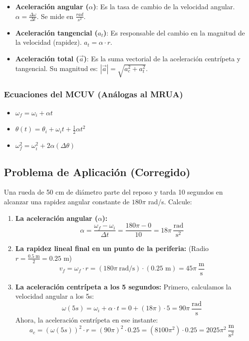 \documentclass[11pt]{article}
\begin{document}
\begin{itemize}
	\item \textbf{Aceleración angular ($\alpha$)}: Es la tasa de cambio de la velocidad angular. $\alpha = \frac{\Delta \omega}{\Delta t}$. Se mide en $\frac{rad}{s^2}$.
	\item \textbf{Aceleración tangencial ($a_t$)}: Es responsable del cambio en la magnitud de la velocidad (rapidez). $a_t = \alpha \cdot r$.
	\item \textbf{Aceleración total ($\vec{a}$)}: Es la suma vectorial de la aceleración centrípeta y tangencial. Su magnitud es: $|\vec{a}| = \sqrt{a_c^2 + a_t^2}$.
\end{itemize}

\subsubsection{Ecuaciones del MCUV (Análogas al MRUA)}
\begin{itemize}
	\item $\omega_f = \omega_i + \alpha t$
	\item $\theta(t) = \theta_i + \omega_i t + \frac{1}{2}\alpha t^2$
	\item $\omega_f^2 = \omega_i^2 + 2\alpha (\Delta\theta)$
\end{itemize}

\subsection{Problema de Aplicación (Corregido)}
Una rueda de 50 cm de diámetro parte del reposo y tarda 10 segundos en alcanzar una rapidez angular constante de $180\pi$ rad/s. Calcule:
\begin{enumerate}
	\item \textbf{La aceleración angular ($\alpha$):}
	      \[ \alpha = \frac{\omega_f - \omega_i}{\Delta t} = \frac{180\pi - 0}{10} = 18\pi \ \frac{\text{rad}}{\text{s}^2} \]

	\item \textbf{La rapidez lineal final en un punto de la periferia:} (Radio $r = \frac{0.5 \text{ m}}{2} = 0.25$ m)
	      \[ v_f = \omega_f \cdot r = (180\pi \ \text{rad/s}) \cdot (0.25 \text{ m}) = 45\pi \ \frac{\text{m}}{\text{s}} \]

	\item \textbf{La aceleración centrípeta a los 5 segundos:}
	      Primero, calculamos la velocidad angular a los 5s:
	      \[ \omega(5s) = \omega_i + \alpha \cdot t = 0 + (18\pi) \cdot 5 = 90\pi \ \frac{\text{rad}}{\text{s}} \]
	      Ahora, la aceleración centrípeta en ese instante:
	      \[ a_c = (\omega(5s))^2 \cdot r = (90\pi)^2 \cdot 0.25 = (8100\pi^2) \cdot 0.25 = 2025\pi^2 \ \frac{\text{m}}{\text{s}^2} \]
\end{enumerate}
\end{document}
